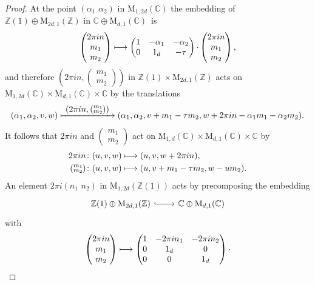 \documentclass[11pt]{article}
\providecommand{\C}{}
\def\mto{\mathchoice{\longmapsto}{\mapsto}{\mapsto}{\mapsto}}
\def\To#1{\mathchoice{\xrightarrow{\textstyle\kern4pt#1\kern3pt}}{\stackrel{#1}{\longrightarrow}}{}{}}
\def\Mto#1{\mathrel{\mapstochar\To{#1}}}
\theoremstyle{plain}
\theoremstyle{definition}
\numberwithin{equation}{subsection}
\renewcommand{\C}{\mathbb C}
\newcommand{\Z}{\mathbb Z}
\newcommand{\rmM}{\mathrm{M}}
\begin{document}
\begin{proof}
At the point $(\alpha_1\,\,\alpha_2)$ in
$\rmM_{1,2d}(\C)$ the embedding of $\Z(1)\oplus\rmM_{2d,1}(\Z)$ in
$\C\oplus \rmM_{d,1}(\C)$~is
\[
\begin{pmatrix}
2\pi in\\ m_1\\ m_2
\end{pmatrix}
\mto
\begin{pmatrix}
1 & -\alpha_1 & -\alpha_2\\0 & 1_d & -\tau
\end{pmatrix}{\cdot}
\begin{pmatrix}
2\pi in\\ m_1\\ m_2
\end{pmatrix},
\]
and therefore $(2\pi in, (\substack{m_1\\m_2}))$ in
$\Z(1)\times\rmM_{2d,1}(\Z)$ acts on $\rmM_{1,2d}(\C)\times
\rmM_{d,1}(\C)\times\C$ by the translations
\[
(\alpha_1,\alpha_2,v,w) \Mto{(2\pi in, (\substack{m_1\\m_2}))}
(\alpha_1,\alpha_2,v+m_1-\tau m_2,w+2\pi in-\alpha_1m_1-\alpha_2m_2).
\]
It follows that $2\pi i n$ and $(\substack{m_1\\m_2})$ act on
$\rmM_{1,d}(\C)\times\rmM_{d,1}(\C)\times\C$ by
\begin{equation}
\label{eq:action_m}
\begin{aligned}
2\pi i n\colon (u,v,w) & \mto (u,v,w+2\pi i n),\\
(\substack{m_1\\m_2})\colon (u,v,w) & \mto (u,v+m_1-\tau m_2,w-um_2).
\end{aligned}
\end{equation}
An element $2\pi i(n_1\,\, n_2)$ in $\rmM_{1,2d}(\Z(1))$ acts by precomposing
the embedding
\[
\begin{tikzcd}
\Z(1)\oplus\rmM_{2d,1}(\Z) \ar[r,hook] & \C\oplus \rmM_{d,1}(\C)
\end{tikzcd}
\]
with
\[
\begin{pmatrix}
2\pi in \\ m_1\\ m_2
\end{pmatrix}
 \mto
\begin{pmatrix}
1 & -2\pi in_1 & -2\pi i n_2\\
0 & 1_d & 0 \\
0 & 0 & 1_d
\end{pmatrix} {\cdot}
\]
\end{proof}
\end{document}
